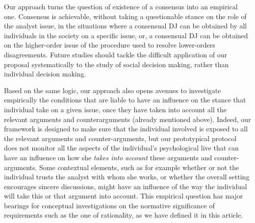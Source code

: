 \documentclass[version=3.21, pagesize, twoside=off, bibliography=totoc, DIV=calc, fontsize=12pt, a4paper, french, english]{scrartcl}
\begin{document}
Our approach turns the question of existence of a consensus into an empirical one. Consensus is achievable, without taking a questionable stance on the role of the analyst issue, in the situations where a consensual \ac{DJ} can be obtained by all individuals in the society on a specific issue, or, a consensual \ac{DJ} can be obtained on the higher-order issue of the procedure used to resolve lower-orders disagreements. Future studies should tackle the difficult application of our proposal systematically to the study of social decision making, rather than individual decision making.

Based on the same logic, our approach also opens avenues to investigate empirically the conditions that are liable to have an influence on the stance that individual take on a given issue, once they have taken into account all the relevant arguments and counterarguments (already mentioned above). Indeed, our framework is designed to make sure that the individual involved is exposed to all the relevant arguments and counter-arguments, but our prototypical protocol does not monitor all the aspects of the individual's psychological live that can have an influence on how she \emph{takes into account} these arguments and counter-arguments. Some contextual elements, such as for example whether or not the individual trusts the analyst with whom she works, or whether the overall setting encourages sincere discussions, might have an influence of the way the individual will take this or that argument into account. %
This empirical question has major bearings for conceptual investigations on the normative significance of requirements such as the one of rationality, as we have defined it in this article.

\end{document}

